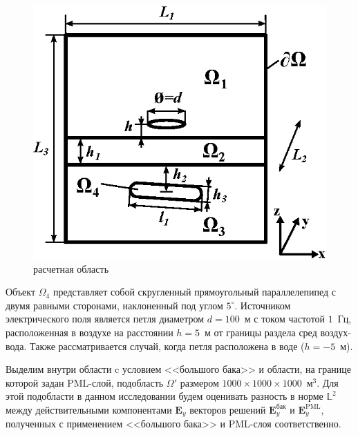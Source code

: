 \documentclass[a4paper,12pt]{article}
\begin{document}
\begin{figure}[H]
	\centering
	\includegraphics[scale=1]{research-2/area_3layers/area_3layers_3.eps}
	\caption{расчетная область}
	\label{fig:res2:area}
\end{figure}

Объект $\Omega_4$ представляет собой скругленный прямоугольный параллелепипед с двумя равными сторонами, наклоненный под углом $5^{\circ}$. Источником электрического поля является петля диаметром $d = 100$~м с током частотой $1$~Гц, расположенная в воздухе на расстоянии $h = 5$~м от границы раздела сред воздух-вода. Также рассматривается случай, когда петля расположена в воде ($h = -5$~м).

Выделим внутри области c условием <<большого бака>> и области, на границе которой задан PML-слой, подобласть $\Omega'$ размером $1000 \times 1000 \times 1000$~м${}^3$. Для этой подобласти в данном исследовании будем оценивать разность в норме $\mathbb{L}^2$ между действительными компонентами $\mathbf{E}_y$ векторов решений $\mathbf{E}_y^{\text{бак}}$ и $\mathbf{E}_y^{\text{PML}}$, полученных с применением <<большого бака>> и PML-слоя соответственно.
\end{document}
